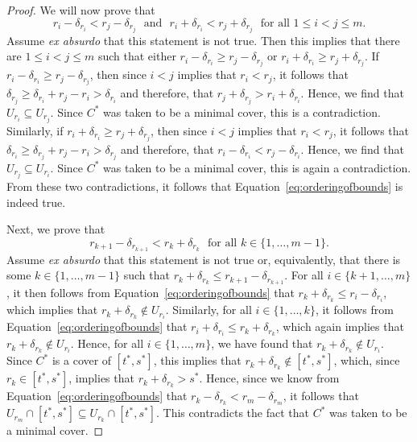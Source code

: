 \documentclass[10pt,a4paper]{paper}
\theoremstyle{definition}
\begin{document}
\begin{proof}
We will now prove that
\begin{equation}\label{eq:orderingofbounds}
r_i-\delta_{r_i}<r_j-\delta_{r_j}
\text{~~and~~}
r_i+\delta_{r_i}<r_j+\delta_{r_j}
\text{~~for all $1\leq i<j\leq m$.}
\end{equation}
Assume \emph{ex absurdo} that this statement is not true. Then this implies that there are $1\leq i<j\leq m$ such that either $r_i-\delta_{r_i}\geq r_j-\delta_{r_j}$ or $r_i+\delta_{r_i}\geq r_j+\delta_{r_j}$. If $r_i-\delta_{r_i}\geq r_j-\delta_{r_j}$, then since $i<j$ implies that $r_i<r_j$, it follows that $\delta_{r_j}\geq\delta_{r_i}+r_j-r_i>\delta_{r_i}$ and therefore, that $r_j+\delta_{r_j}>r_i+\delta_{r_i}$. 
Hence, we find that $U_{r_i}\subseteq U_{r_j}$. Since $C^*$ was taken to be a minimal cover, this is a contradiction.
Similarly, if $r_i+\delta_{r_i}\geq r_j+\delta_{r_j}$, then since $i<j$ implies that $r_i<r_j$, it follows that $\delta_{r_i}\geq\delta_{r_j}+r_j-r_i>\delta_{r_j}$ and therefore, that $r_i-\delta_{r_i}<r_j-\delta_{r_i}$. Hence, we find that $U_{r_j}\subseteq U_{r_i}$. Since $C^*$ was taken to be a minimal cover, this is again a contradiction. From these two contradictions, it follows that Equation~\eqref{eq:orderingofbounds} is indeed true.

Next, we prove that
\begin{equation}\label{eq:overlapasyouwantit}
r_{k+1}-\delta_{r_{k+1}}<r_k+\delta_{r_k}
\text{~~for all $k\in\{1,\dots,m-1\}$.}
\end{equation}
Assume \emph{ex absurdo} that this statement is not true or, equivalently, that there is some $k\in\{1,\dots,m-1\}$ such that $r_k+\delta_{r_k}\leq r_{k+1}-\delta_{r_{k+1}}$. For all $i\in\{k+1,\dots, m\}$, it then follows from Equation~\eqref{eq:orderingofbounds} that $r_k+\delta_{r_k}\leq r_i-\delta_{r_i}$, which implies that $r_k+\delta_{r_k}\notin U_{r_i}$. Similarly, for all $i\in\{1,\dots,k\}$, it follows from Equation~\eqref{eq:orderingofbounds} that $r_i+\delta_{r_i}\leq r_k+\delta_{r_k}$, which again implies that $r_k+\delta_{r_k}\notin U_{r_i}$. 
Hence, for all $i\in\{1,\dots,m\}$, we have found that $r_k+\delta_{r_k}\notin U_{r_i}$. 
Since $C^*$ is a cover of $[t^*,s^*]$, this implies that $r_k+\delta_{r_k}\notin[t^*,s^*]$, which, since $r_k\in[t^*,s^*]$, implies that $r_k+\delta_{r_k}>s^*$. Hence, since we know from Equation~\eqref{eq:orderingofbounds} that $r_k-\delta_{r_k}<r_m-\delta_{r_m}$, it follows that $U_{r_m}\cap[t^*,s^*]\subseteq U_{r_k}\cap[t^*,s^*]$. This contradicts the fact that $C^*$ was taken to be a minimal cover.


\end{proof}
\end{document}
